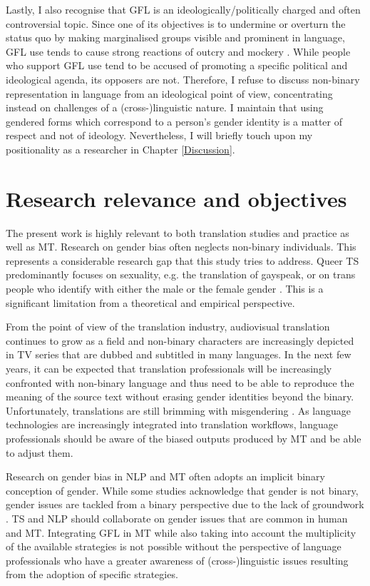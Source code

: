 Lastly, I also recognise that GFL is an ideologically/politically charged and often controversial topic. Since one of its objectives is to undermine or overturn the status quo by making marginalised groups visible and prominent in language, GFL use tends to cause strong reactions of outcry and mockery \citep{vergoossen2020four,cosinonschwa}. While people who support GFL use tend to be accused of promoting a specific political and ideological agenda, its opposers are not. Therefore, I refuse to discuss non-binary representation in language from an ideological point of view, concentrating instead on challenges of a (cross-)linguistic nature. I maintain that using gendered forms which correspond to a person's gender identity is a matter of respect and not of ideology. Nevertheless, I will briefly touch upon my positionality as a researcher in Chapter \ref{Discussion}.

\section{Research relevance and objectives}
The present work is highly relevant to both translation studies and practice as well as MT. Research on gender bias often neglects non-binary individuals. This represents a considerable research gap that this study tries to address. Queer TS predominantly focuses on sexuality, e.g. the translation of gayspeak, or on trans people who identify with either the male or the female gender \citep{baer2017introduction}. This is a significant limitation from a theoretical and empirical perspective. %

From the point of view of the translation industry, audiovisual translation continues to grow as a field and non-binary characters are increasingly depicted in TV series that are dubbed and subtitled in many languages. In the next few years, it can be expected that translation professionals will be increasingly confronted with non-binary language and thus need to be able to reproduce the meaning of the source text without erasing gender identities beyond the binary. Unfortunately, translations are still brimming with misgendering \citep{lopez2022trans,attig2023call,lardellitranslating}. As language technologies are increasingly integrated into translation workflows, language professionals should be aware of the biased outputs produced by MT and be able to adjust them.

Research on gender bias in NLP and MT often adopts an implicit binary conception of gender. While some studies acknowledge that gender is not binary, gender issues are tackled from a binary perspective due to the lack of groundwork \citep{sun2019mitigating,stanczak2021survey}. TS and NLP should collaborate on gender issues that are common in human and MT. Integrating GFL in MT while also taking into account the multiplicity of the available strategies is not possible without the perspective of language professionals who have a greater awareness of (cross-)linguistic issues resulting from the adoption of specific  strategies.

